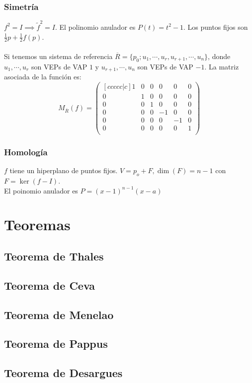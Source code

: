 \documentclass{article}
\begin{document}
\subsubsection{Simetría}
$f^2 = I \implies \widetilde{f}^2 = I$. El polinomio anulador es $P(t) = t^2-1$.
Los puntos fijos son $\frac{1}{2}p+\frac{1}{2}f(p)$. \\
\\
Si tenemos un sistema de referencia $\overline{R} = \{p_0; u_1, \cdots , u_r, u_{r+1}, \cdots, u_n\}$, donde $u_1, \cdots , u_r$ son VEPs de VAP $1$ y $u_{r+1}, \cdots, u_n$ son VEPs de VAP $-1$. La matriz asociada de la función es:
\[
M_{\overline{R}}(f) = 
\begin{pmatrix}[ccccc|c]
    1 & 0 & 0 & 0 & 0 & 0 \\
    0 & 1 & 0 & 0 & 0 & 0 \\
    0 & 0 & 1 & 0 & 0 & 0 \\
    0 & 0 & 0 & -1 & 0 & 0 \\
    0 & 0 & 0 & 0 & -1 & 0 \\
    \hline
    0 & 0 & 0 & 0 & 0 & 1 \\
\end{pmatrix}
\]
\subsubsection{Homología}
$f$ tiene un hiperplano de puntos fijos. $V = p_o + F, \dim(F) = n-1$ con $F = \ker(f-I)$. \\
El poinomio anulador es $P=(x-1)^{n-1}(x-a)$

\section{Teoremas}
\subsection{Teorema de Thales}
\subsection{Teorema de Ceva}
\subsection{Teorema de Menelao}
\subsection{Teorema de Pappus}
\subsection{Teorema de Desargues}
\end{document}
